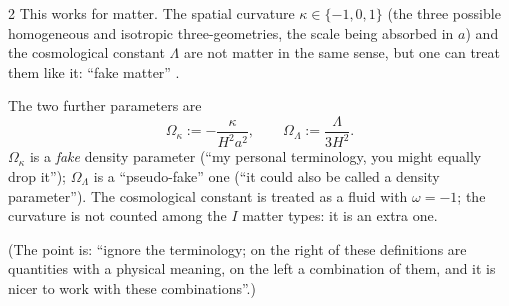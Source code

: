 \begin{paracol}{2}
This works for matter. The spatial curvature $\kappa\in\{-1,0,1\}$ (the three possible homogeneous and isotropic three-geometries, the scale being absorbed in $a$) and the cosmological constant $\Lambda$ are not matter in the same sense, but one can treat them like it: ``fake matter'' .

\begin{definition}\label{def:c21-fake}
The two further parameters are
\[
  \Omega_\kappa:=-\frac{\kappa}{H^2a^2},\qquad \Omega_\Lambda:=\frac{\Lambda}{3H^2}.
\]
$\Omega_\kappa$ is a \emph{fake} density parameter (``my personal terminology, you might equally drop it''); $\Omega_\Lambda$ is a ``pseudo-fake'' one (``it could also be called a density parameter''). The cosmological constant is treated as a fluid with $\omega=-1$; the curvature is not counted among the $I$ matter types: it is an extra one.
\end{definition}
(The point is: ``ignore the terminology; on the right of these definitions are quantities with a physical meaning, on the left a combination of them, and it is nicer to work with these combinations''.)


\end{paracol}
